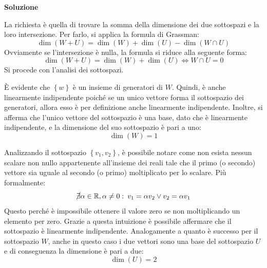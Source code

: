 \documentclass[a4paper]{article}
\begin{document}
	\noindent
	\textcolor{Green4}{\textbf{Soluzione}}\newline
	
	\noindent
	La richiesta è quella di trovare la somma della dimensione dei due sottospazi e la loro intersezione. Per farlo, si applica la formula di Grassman:
	\begin{equation*}
		\dim\left(W + U\right) = \dim\left(W\right) + \dim\left(U\right) - \dim\left(W \cap U\right)
	\end{equation*}
	Ovviamente se l'intersezione è nulla, la formula si riduce alla seguente forma:
	\begin{equation*}
		\dim\left(W + U\right) = \dim\left(W\right) + \dim\left(U\right) \iff W \cap U = {0}
	\end{equation*}
	Si procede con l'analisi dei sottospazi.\newline
	
	\noindent
	È evidente che $\left\{w\right\}$ è un insieme di generatori di $W$. Quindi, è anche linearmente indipendente poiché se un unico vettore forma il sottospazio dei generatori, allora esso è per definizione anche linearmente indipendente. Inoltre, si afferma che l'unico vettore del sottospazio è una base, dato che è linearmente indipendente, e la dimensione del suo sottospazio è pari a uno:
	\begin{equation*}
		\dim\left(W\right) = 1
	\end{equation*}\newline
	
	\noindent
	Analizzando il sottospazio $\left\{v_{1},v_{2}\right\}$, è possibile notare come non esista nessun scalare non nullo appartenente all'insieme dei reali tale che il primo (o secondo) vettore sia uguale al secondo (o primo) moltiplicato per lo scalare. Più formalmente:
	\begin{equation*}
		\cancel{\exists} \alpha \in \mathbb{R}, \alpha \ne 0: \: v_{1} = \alpha v_{2} \lor v_{2} = \alpha v_{1}
	\end{equation*}
	Questo perché è impossibile ottenere il valore zero se non moltiplicando un elemento per zero. Grazie a questa intuizione è possibile affermare che il sottospazio è linearmente indipendente. Analogamente a quanto è successo per il sottospazio $W$, anche in questo caso i due vettori sono una base del sottospazio $U$ e di conseguenza la dimensione è pari a due:
	\begin{equation*}
		\dim\left(U\right) = 2
	\end{equation*}\newline
\end{document}
